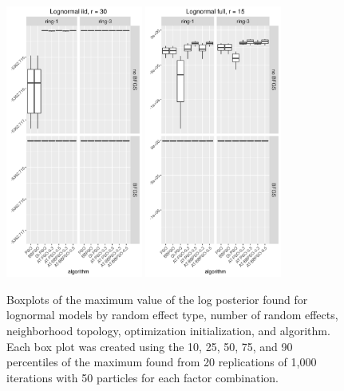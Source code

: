 \documentclass[12pt]{article}
\begin{document}
\begin{figure}[!ht]
\centering
\includegraphics[width=0.4\textwidth]{code/pop/maxplot22.png}
\includegraphics[width=0.4\textwidth]{code/pop/maxplot24.png}
\caption{Boxplots of the maximum value of the log posterior found for lognormal models by random effect type, number of random effects, neighborhood topology, optimization initialization, and algorithm. Each box plot was created using the 10, 25, 50, 75, and 90 percentiles of the maximum found from 20 replications of 1,000 iterations with 50 particles for each factor combination.}
\label{fig:popmaxboxplot2}
\end{figure}
\end{document}
